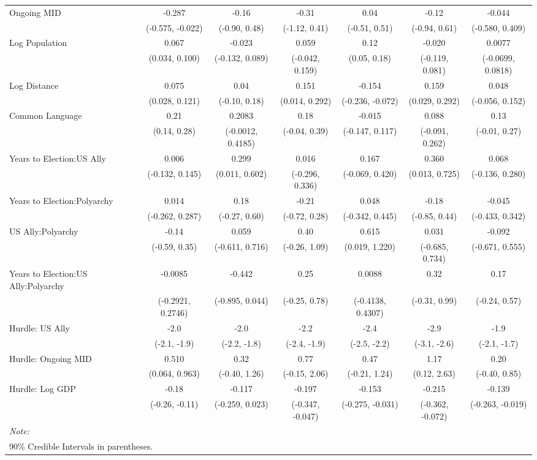 \begin{table}
{\begin{tabular}[t]{lcccccc}
Ongoing MID & -0.287 & -0.16 & -0.31 & 0.04 & -0.12 & -0.044\\
 & (-0.575, -0.022) & (-0.90, 0.48) & (-1.12, 0.41) & (-0.51, 0.51) & (-0.94, 0.61) & (-0.580, 0.409)\\
Log Population & 0.067 & -0.023 & 0.059 & 0.12 & -0.020 & 0.0077\\
 & (0.034, 0.100) & (-0.132, 0.089) & (-0.042, 0.159) & (0.05, 0.18) & (-0.119, 0.081) & (-0.0699, 0.0818)\\
Log Distance & 0.075 & 0.04 & 0.151 & -0.154 & 0.159 & 0.048\\
 & (0.028, 0.121) & (-0.10, 0.18) & (0.014, 0.292) & (-0.236, -0.072) & (0.029, 0.292) & (-0.056, 0.152)\\
Common Language & 0.21 & 0.2083 & 0.18 & -0.015 & 0.088 & 0.13\\
 & (0.14, 0.28) & (-0.0012, 0.4185) & (-0.04, 0.39) & (-0.147, 0.117) & (-0.091, 0.262) & (-0.01, 0.27)\\
Years to Election:US Ally & 0.006 & 0.299 & 0.016 & 0.167 & 0.360 & 0.068\\
 & (-0.132, 0.145) & (0.011, 0.602) & (-0.296, 0.336) & (-0.069, 0.420) & (0.013, 0.725) & (-0.136, 0.280)\\
Years to Election:Polyarchy & 0.014 & 0.18 & -0.21 & 0.048 & -0.18 & -0.045\\
 & (-0.262, 0.287) & (-0.27, 0.60) & (-0.72, 0.28) & (-0.342, 0.445) & (-0.85, 0.44) & (-0.433, 0.342)\\
US Ally:Polyarchy & -0.14 & 0.059 & 0.40 & 0.615 & 0.031 & -0.092\\
 & (-0.59, 0.35) & (-0.611, 0.716) & (-0.26, 1.09) & (0.019, 1.220) & (-0.685, 0.734) & (-0.671, 0.555)\\
Years to Election:US Ally:Polyarchy & -0.0085 & -0.442 & 0.25 & 0.0088 & 0.32 & 0.17\\
 & (-0.2921, 0.2746) & (-0.895, 0.044) & (-0.25, 0.78) & (-0.4138, 0.4307) & (-0.31, 0.99) & (-0.24, 0.57)\\
Hurdle: US Ally & -2.0 & -2.0 & -2.2 & -2.4 & -2.9 & -1.9\\
 & (-2.1, -1.9) & (-2.2, -1.8) & (-2.4, -1.9) & (-2.5, -2.2) & (-3.1, -2.6) & (-2.1, -1.7)\\
Hurdle: Ongoing MID & 0.510 & 0.32 & 0.77 & 0.47 & 1.17 & 0.20\\
 & (0.064, 0.963) & (-0.40, 1.26) & (-0.15, 2.06) & (-0.21, 1.24) & (0.12, 2.63) & (-0.40, 0.85)\\
Hurdle: Log GDP & -0.18 & -0.117 & -0.197 & -0.153 & -0.215 & -0.139\\
 & (-0.26, -0.11) & (-0.259, 0.023) & (-0.347, -0.047) & (-0.275, -0.031) & (-0.362, -0.072) & (-0.263, -0.019)\\
\bottomrule
\multicolumn{7}{l}{\rule{0pt}{1em}\textit{Note: }}\\
\multicolumn{7}{l}{\rule{0pt}{1em}90\% Credible Intervals in parentheses.}\\
\end{tabular}}
\end{table}
